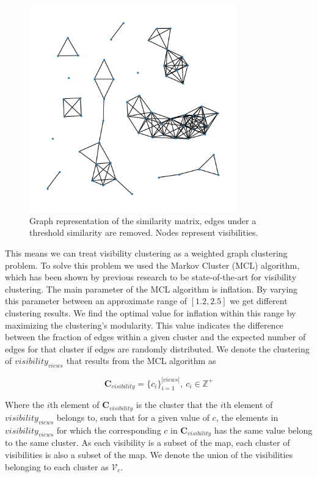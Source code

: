 \begin{figure}[h]
    \centering
    \includegraphics*[width=0.8\textwidth]{./fig/mutual_visibility_graph.png}
    \caption{Graph representation of the similarity matrix, edges under a threshold similarity are removed. Nodes represent visibilities.}
    \label{fig:similarity_graph}
\end{figure}

This means we can treat visibility clustering as a weighted graph clustering problem. To solve this problem we used the Markov Cluster (MCL) algorithm, which has been shown by previous research to be state-of-the-art for visibility clustering. The main parameter of the MCL algorithm is inflation. By varying this parameter between an approximate range of \([1.2, 2.5]\) we get different clustering results. We find the optimal value for inflation within this range by maximizing the clustering's modularity. This value indicates the difference between the fraction of edges within a given cluster and the expected number of edges for that cluster if edges are randomly distributed. We denote the clustering of \(visibility_{views}\) that results from the MCL algorithm as 

\begin{equation}
    \label{eq:c_visibility}
    \mathbf{C}_{visibility} = \{c_i\}_{i=1}^{|views|},\ c_i \in \mathbb{Z}^+
\end{equation}

Where the \(i\)th element of \(\mathbf{C}_{visibility}\) is the cluster that the \(i\)th element of \(visibility_{views}\) belongs to, such that for a given value of \(c\), the elements in \(visibility_{views}\) for which the corresponding \(c\) in \(\mathbf{C}_{visibility}\) has the same value belong to the same cluster. As each visibility is a subset of the map, each cluster of visibilities is also a subset of the map. We denote the union of the visibilities belonging to each cluster as \(\mathcal{V}_{c}\). 

